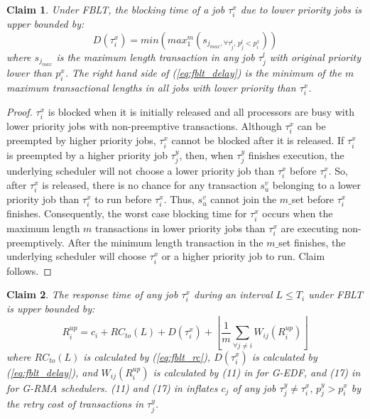 \documentclass[a4paper,english]{article}
\newtheorem{clm}{Claim}
\newtheorem{proof}{Proof}
\begin{document}
\begin{clm}
Under FBLT, the blocking time of a job $\tau_{i}^{x}$ due to lower priority
jobs is upper bounded by: 
\begin{equation}
D(\tau_{i}^{x})=min\left(max_{1}^{m}(s_{j_{max},\forall\tau_{j}^{l},\, p_{j}^{l}<p_{i}^{x}})\right)\label{eq:fblt_delay}
\end{equation}
where $s_{j_{max}}$ is the maximum length transaction in any job
$\tau_{j}^{l}$ with original priority lower than $p_{i}^{x}$. The
right hand side of (\ref{eq:fblt_delay}) is the minimum of the $m$
maximum transactional lengths in all jobs with lower priority than
$\tau_{i}^{x}$.
\end{clm}


\begin{proof}\normalfont
$\tau_{i}^{x}$ is blocked when it is initially released and all processors
are busy with lower priority jobs with non-preemptive transactions.
Although $\tau_{i}^{x}$ can be preempted by higher priority jobs,
$\tau_{i}^{x}$ cannot be blocked after it is released. If $\tau_{i}^{x}$
is preempted by a higher priority job $\tau_{j}^{y}$, then, when $\tau_{j}^{y}$
finishes execution, the underlying scheduler will not choose a lower
priority job than $\tau_{i}^{x}$ before $\tau_{i}^{x}$. So, after
$\tau_{i}^{x}$ is released, there is no chance for any transaction
$s_{u}^{v}$ belonging to a lower priority job than $\tau_{i}^{x}$
to run before $\tau_{i}^{x}$. Thus, $s_{u}^{v}$ cannot join the $m\_$set
before $\tau_{i}^{x}$ finishes. Consequently, the worst case blocking
time for $\tau_{i}^{x}$ occurs when the maximum length $m$ transactions
in lower priority jobs than $\tau_{i}^{x}$ are executing non-preemptively.
After the minimum length transaction in the $m\_$set finishes, the
underlying scheduler will choose $\tau_{i}^{x}$ or a higher priority
job to run. Claim follows.
\end{proof}

\begin{clm}
The response time of any job $\tau_{i}^{x}$ during an interval $L\le T_{i}$
under FBLT is upper bounded by:
\begin{equation}
R_{i}^{up}=c_{i}+RC_{to}(L)+D(\tau_{i}^{x})+\left\lfloor \frac{1}{m}\sum_{\forall j\ne i}W_{ij}(R_{i}^{up})\right\rfloor \label{eq:fblt_res_time}
\end{equation}
where $RC_{to}(L)$ is calculated by (\ref{eq:fblt_rc}), $D(\tau_{i}^{x})$
is calculated by (\ref{eq:fblt_delay}), and $W_{ij}(R_{i}^{up})$
is calculated by (11) in \cite{stmconcurrencycontrol:emsoft11} for
G-EDF, and (17) in \cite{stmconcurrencycontrol:emsoft11} for G-RMA schedulers.
(11) and (17) in \cite{stmconcurrencycontrol:emsoft11} inflates $c_{j}$
of any job $\tau_{j}^y\ne\tau_{i}^x,\, p_{j}^y>p_{i}^x$ by the retry cost
of transactions in $\tau_{j}^y$.
\end{clm}
\end{document}
